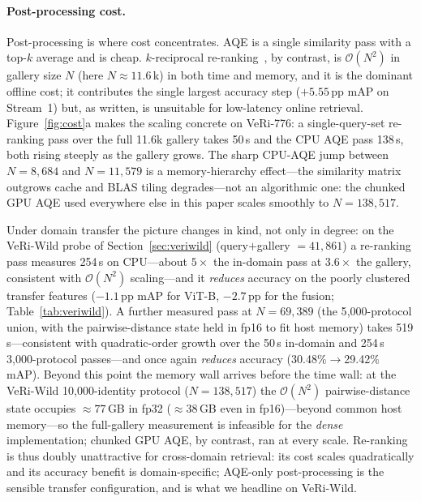 \documentclass[10pt,a4paper]{article}
\begin{document}
\paragraph{Post-processing cost.} Post-processing is where cost concentrates.
AQE is a single similarity pass with a top-$k$ average and is cheap.
$k$-reciprocal re-ranking~\cite{zhong2017rerank}, by contrast, is
$\mathcal{O}(N^{2})$ in gallery size $N$ (here $N\!\approx\!11.6$\,k) in both
time and memory, and it is the dominant offline cost; it contributes the single
largest accuracy step ($+5.55$\,pp mAP on Stream~1) but, as written, is
unsuitable for low-latency online retrieval. Figure~\ref{fig:cost}a makes the
scaling concrete on VeRi-776: a single-query-set re-ranking pass over the full
11.6k gallery takes 50\,s and the CPU AQE pass 138\,s, both rising steeply as
the gallery grows. The sharp CPU-AQE jump between $N{=}8{,}684$ and
$N{=}11{,}579$ is a memory-hierarchy effect---the similarity matrix outgrows
cache and BLAS tiling degrades---not an algorithmic one: the chunked GPU AQE
used everywhere else in this paper scales smoothly to $N{=}138{,}517$.

Under domain transfer the picture changes in kind, not only in degree: on the
VeRi-Wild probe of Section~\ref{sec:veriwild} (query$+$gallery $=41{,}861$) a
re-ranking pass measures 254\,s on CPU---about $5\times$ the in-domain pass at
$3.6\times$ the gallery, consistent with $\mathcal{O}(N^{2})$ scaling---and it
\emph{reduces} accuracy on the poorly clustered transfer features ($-1.1$\,pp
mAP for ViT-B, $-2.7$\,pp for the fusion; Table~\ref{tab:veriwild}). A further
measured pass at $N{=}69{,}389$ (the 5{,}000-protocol union, with the
pairwise-distance state held in fp16 to fit host memory) takes
519\,s---consistent with quadratic-order growth over the 50\,s in-domain and
254\,s 3{,}000-protocol passes---and once again \emph{reduces} accuracy
(30.48\%$\rightarrow$29.42\% mAP). Beyond this point the memory wall arrives
before the time wall: at the VeRi-Wild 10{,}000-identity protocol
($N{=}138{,}517$) the $\mathcal{O}(N^{2})$ pairwise-distance state occupies
${\approx}77$\,GB in fp32 (${\approx}38$\,GB even in fp16)---beyond common host
memory---so the full-gallery measurement is infeasible for the \emph{dense}
implementation; chunked GPU AQE, by contrast, ran at every scale. Re-ranking is
thus doubly unattractive for cross-domain retrieval: its cost scales
quadratically and its accuracy benefit is domain-specific; AQE-only
post-processing is the sensible transfer configuration, and is what we headline
on VeRi-Wild.
\end{document}
